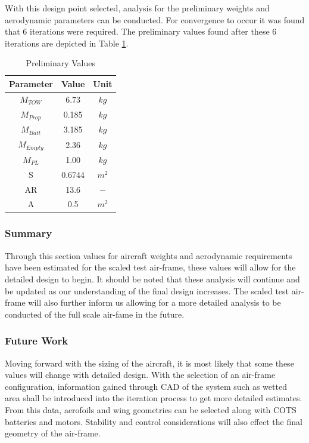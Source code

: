 With this design point selected, analysis for the preliminary weights and aerodynamic parameters can be conducted. For convergence to occur it was found that 6 iterations were required. The preliminary values found after these 6 iterations are depicted in Table \ref{tab:preresults}.

\begin{table}[H]
\centering
\caption{Preliminary Values}
\label{tab:preresults}
\begin{tabular}{|c|c|c|}
\hline
Parameter & Value & Unit \\ \hline\hline
$M_{TOW}$ & 6.73 & $kg$ \\ \hline
$M_{Prop}$ & 0.185 & $kg$ \\ \hline
$M_{Batt}$ & 3.185 & $kg$ \\ \hline
$M_{Empty}$ & 2.36 & $kg$ \\ \hline
$M_{PL}$ & 1.00 & $kg$ \\ \hline
S & 0.6744 & $m^2$ \\ \hline
AR & 13.6 & $-$ \\ \hline
A & 0.5 & $m^2$ \\ \hline
\end{tabular}%
\end{table}

\subsubsection{Summary}
Through this section values for aircraft weights and aerodynamic requirements have been estimated for the scaled test air-frame, these values will allow for the detailed design to begin. It should be noted that these analysis will continue and be updated as our understanding of the final design increases. The scaled test air-frame will also further inform us allowing for a more detailed analysis to be conducted of the full scale air-fame in the future. 

\subsubsection{Future Work}
Moving forward with the sizing of the aircraft, it is most likely that some these values will change with detailed design. With the selection of an air-frame configuration, information gained through CAD of the system such as wetted area shall be introduced into the iteration process to get more detailed estimates. From this data, aerofoils and wing geometries can be selected along with COTS batteries and motors. Stability and control considerations will also effect the final geometry of the air-frame. \\

